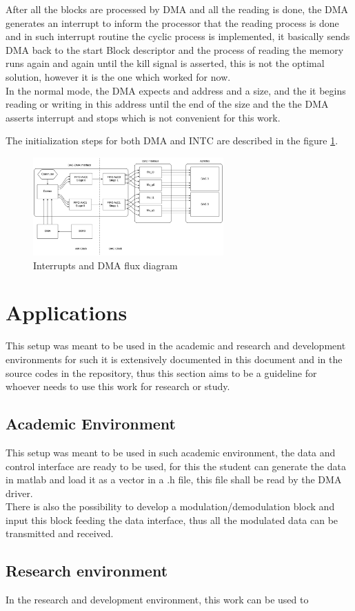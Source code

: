 After all the blocks are processed by DMA and all the reading is done, the DMA
generates an interrupt to inform the processor that the reading process is done
and in such interrupt routine the cyclic process is implemented, it basically
sends DMA back to the start Block descriptor and the process of reading the
memory runs again and again until the kill signal is asserted, this is not the
optimal solution, however it is the one which worked for now.\\

In the normal mode, the DMA expects and address and a size, and the it begins
reading or writing in this address until the end of the size and the the DMA
asserts interrupt and stops which is not convenient for this work.

The initialization steps for both DMA and INTC are described in the figure
\ref{fig:intcdmainit}.

\begin{figure}[htbp]
    \centering
    \includegraphics[width=0.65\textwidth]{./figures/txdata_if}
    \caption{ Interrupts and DMA flux diagram
    \label{fig:intcdmainit}}
\end{figure}

\section{Applications}

This setup was meant to be used in the academic and research and development
environments for such it is extensively documented in this document and in the
source codes in the repository, thus this section aims to be a guideline for
whoever needs to use this work for research or study.

\subsection{Academic Environment}

This setup was meant to be used in such academic environment, the data and control
interface are ready to be used, for this the student can generate the data in
matlab and load it as a vector in a .h file, this file shall be read by the DMA
driver.\\
There is also the possibility to develop a modulation/demodulation block
and input this block feeding the data interface, thus all the modulated data can
be transmitted and received.

\subsection{Research environment}

In the research and development environment, this work can be used to
